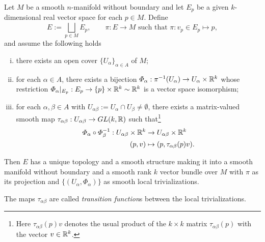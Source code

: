 \begin{theorem}\label{thm:bundle_chart_thm}
  Let $M$ be a smooth $n$-manifold without boundary and let $E_p$ be a given $k$-dimensional real vector space for each $p\in M$.
  Define
  \begin{equation}
    E := \bigsqcup_{p\in M} E_p, \qquad
    \pi : E\to M \mbox{ such that } \pi : v_p \in E_p \mapsto p,
  \end{equation}
  and assume the following holds
  \begin{enumerate}[(i)]
    \item there exists an open cover $\{U_\alpha\}_{\alpha\in A}$ of $M$;
    \item for each $\alpha\in A$, there exists a bijection $\varPhi_\alpha: \pi^{-1}(U_\alpha) \to U_\alpha\times\mathbb{R}^k$ whose restriction $\varPhi_\alpha|_{E_p} : E_p \to \{p\}\times\mathbb{R}^k \sim \mathbb{R}^k$ is a vector space isomorphism;
    \item for each $\alpha,\beta \in A$ with $U_{\alpha\beta}:=U_\alpha \cap U_\beta \neq \emptyset$, there exists a matrix-valued smooth map $\tau_{\alpha\beta}: U_{\alpha\beta} \to GL(k,\mathbb{R})$ such that\footnote{Here $\tau_{\alpha\beta}(p) v$ denotes the usual product of the $k\times k$ matrix $\tau_{\alpha\beta}(p)$ with the vector $v\in\mathbb{R}^k$.}
      \begin{align}
        \varPhi_\alpha \circ \varPhi_\beta^{-1} : U_{\alpha\beta}\times\mathbb{R}^k &\to U_{\alpha\beta}\times\mathbb{R}^k\\
                                                  (p, v) & \mapsto (p, \tau_{\alpha\beta}(p) v).
      \end{align}
  \end{enumerate}
  Then $E$ has a unique topology and a smooth structure making it into a smooth manifold without boundary and a smooth rank $k$ vector bundle over $M$ with $\pi$ as its projection and $\{(U_\alpha, \varPhi_\alpha)\}$ as smooth local trivializations.
\end{theorem}
The maps $\tau_{\alpha\beta}$ are called \emph{transition function}s between the local trivializations.
